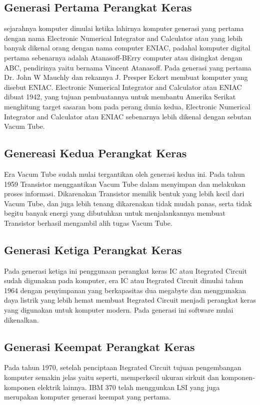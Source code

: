 \subsection{Generasi Pertama Perangkat Keras}
sejarahnya komputer dimulai ketika lahirnya 
komputer generasi yang pertama dengan nama Electronic Numerical Integrator and Calculator atau yang lebih banyak dikenal orang dengan 
nama computer ENIAC, padahal komputer digital pertama sebenarnya adalah Atanasoff-BErry computer atau disingkat dengan ABC,
pendirinya yaitu bernama Vincent Atanasoff. Pada generasi yang pertama Dr. John W Mauchly dan rekannya J. Presper Eckert membuat 
komputer yang disebut ENIAC. Electronic Numerical Integrator and Calculator atau ENIAC dibuat 1942, yang tujuan pembuatannya untuk
membantu Amerika Serikat menghitung target sasaran bom pada perang dunia kedua, Electronic Numerical Integrator and Calculator atau 
ENIAC sebenarnya lebih dikenal dengan sebutan Vacum Tube.

\subsection{Genereasi Kedua Perangkat Keras}
Era Vacum Tube sudah mulai tergantikan oleh generasi kedua ini. Pada tahun 1959 Transistor menggantikan Vacum Tube dalam
menyimpan dan melakukan proses informasi. Dikarenakan Transistor memilik bentuk yang lebih kecil dari Vacum Tube, dan juga lebih tenang
dikarenakan tidak mudah panas, serta tidak begitu banyak energi yang dibutuhkan untuk menjalankannya membuat Transistor berhasil mengambil
alih tugas Vacum Tube.

\subsection{Generasi Ketiga Perangkat Keras}
Pada generasi ketiga ini penggunaan perangkat keras IC atau Itegrated Circuit sudah digunakan pada komputer, era IC atau Itegrated Circuit
dimulai tahun 1964 dengan penyimpanan yang berkapasitas dua megabyte dan menggunakan daya listrik yang lebih hemat membuat Itegrated Circuit
menjadi perangkat keras yang digunakan untuk komputer modern. Pada generasi ini software mulai dikenalkan.

\subsection{Generasi Keempat Perangkat Keras}
Pada tahun 1970, setelah penciptaan Itegrated Circuit tujuan pengembangan komputer semakin jelas yaitu seperti, memperkecil ukuran
sirkuit dan komponen-komponen elektrik lainnya. IBM 370 telah menggunkan LSI yang juga merupakan komputer generasi keempat yang pertama.

